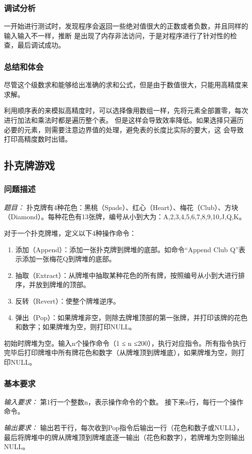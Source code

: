 \documentclass[a4paper,11pt]{article}%
\newenvironment{shadedquotation}
 {\begin{shaded*}
  \quoting[leftmargin=0pt, vskip=0pt]
 }
 {\endquoting
 \end{shaded*}
}
\begin{document}
\subsubsection{调试分析}
一开始进行测试时，发现程序会返回一些绝对值很大的正数或者负数，并且同样的输入输入不一样，推断
是出现了内存非法访问，于是对程序进行了针对性的检查，最后调试成功。
\subsubsection{总结和体会}
尽管这个级数求和能够给出准确的求和公式，但是由于数值很大，只能用高精度来求解。

利用顺序表的来模拟高精度时，可以选择像用数组一样，先将元素全部置零，每次进行加法和乘法时都是遍历整个表。
但是这样会导致效率降低。如果选择只遍历必要的元素，则需要注意边界值的处理，避免表的长度比实际的要大，这
会导致打印高精度数时出错。
\subsection{扑克牌游戏}
\subsubsection{问题描述}
\begin{shadedquotation}
    \emph{题目：}
     扑克牌有4种花色：黑桃（Spade）、红心（Heart）、梅花（Club）、方块（Diamond）。每种花色有13张牌，编号从小到大为：A,2,3,4,5,6,7,8,9,10,J,Q,K。

     对于一个扑克牌堆，定义以下4种操作命令：
     \begin{enumerate}
        \item 添加（Append）：添加一张扑克牌到牌堆的底部。如命令“Append Club Q”表示添加一张梅花Q到牌堆的底部。
        \item 抽取（Extract）：从牌堆中抽取某种花色的所有牌，按照编号从小到大进行排序，并放到牌堆的顶部。
        \item 反转（Revert）：使整个牌堆逆序。
        \item 弹出（Pop）：如果牌堆非空，则除去牌堆顶部的第一张牌，并打印该牌的花色和数字；如果牌堆为空，则打印NULL。
     \end{enumerate}
     初始时牌堆为空。输入n个操作命令（1 ≤ n ≤200），执行对应指令。所有指令执行完毕后打印牌堆中所有牌花色和数字（从牌堆顶到牌堆底），如果牌堆为空，则打印NULL。
\end{shadedquotation}
\subsubsection{基本要求}
\begin{shadedquotation}
    \emph{输入要求：}
    第1行一个整数n，表示操作命令的个数。
    接下来n行，每行一个操作命令。
\end{shadedquotation}
\begin{shadedquotation}
    \emph{输出要求：}
    输出若干行，每次收到Pop指令后输出一行（花色和数子或NULL），最后将牌堆中的牌从牌堆顶到牌堆底逐一输出（花色和数字），若牌堆为空则输出NULL。
\end{shadedquotation}
\end{document}
